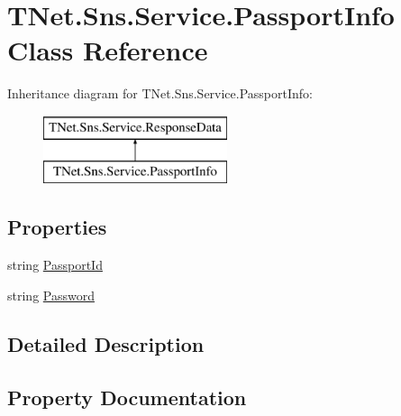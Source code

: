 \hypertarget{class_t_net_1_1_sns_1_1_service_1_1_passport_info}{}\section{T\+Net.\+Sns.\+Service.\+Passport\+Info Class Reference}
\label{class_t_net_1_1_sns_1_1_service_1_1_passport_info}


 


Inheritance diagram for T\+Net.\+Sns.\+Service.\+Passport\+Info\+:\begin{figure}[H]
\begin{center}
\leavevmode
\includegraphics[height=2.000000cm]{class_t_net_1_1_sns_1_1_service_1_1_passport_info}
\end{center}
\end{figure}
\subsection*{Properties}
\begin{DoxyCompactItemize}
\item 
string \mbox{\hyperlink{class_t_net_1_1_sns_1_1_service_1_1_passport_info_a4b20f24b16b91f340cf9f8a49472762d}{Passport\+Id}}
\item 
string \mbox{\hyperlink{class_t_net_1_1_sns_1_1_service_1_1_passport_info_aab7e520cd48d055423867d492211d047}{Password}}
\end{DoxyCompactItemize}


\subsection{Detailed Description}




\subsection{Property Documentation}
\mbox{\label{class_t_net_1_1_sns_1_1_service_1_1_passport_info_a4b20f24b16b91f340cf9f8a49472762d}} 
